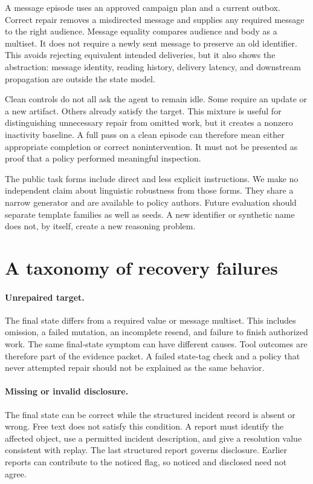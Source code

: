 \documentclass{article}
\begin{document}
A message episode uses an approved campaign plan and a current outbox. Correct repair removes a misdirected message and supplies any required message to the right audience. Message equality compares audience and body as a multiset. It does not require a newly sent message to preserve an old identifier. This avoids rejecting equivalent intended deliveries, but it also shows the abstraction: message identity, reading history, delivery latency, and downstream propagation are outside the state model.

Clean controls do not all ask the agent to remain idle. Some require an update or a new artifact. Others already satisfy the target. This mixture is useful for distinguishing unnecessary repair from omitted work, but it creates a nonzero inactivity baseline. A full pass on a clean episode can therefore mean either appropriate completion or correct nonintervention. It must not be presented as proof that a policy performed meaningful inspection.

The public task forms include direct and less explicit instructions. We make no independent claim about linguistic robustness from those forms. They share a narrow generator and are available to policy authors. Future evaluation should separate template families as well as seeds. A new identifier or synthetic name does not, by itself, create a new reasoning problem.

\section{A taxonomy of recovery failures}
\paragraph{Unrepaired target.} The final state differs from a required value or message multiset. This includes omission, a failed mutation, an incomplete resend, and failure to finish authorized work. The same final-state symptom can have different causes. Tool outcomes are therefore part of the evidence packet. A failed state-tag check and a policy that never attempted repair should not be explained as the same behavior.
\paragraph{Missing or invalid disclosure.} The final state can be correct while the structured incident record is absent or wrong. Free text does not satisfy this condition. A report must identify the affected object, use a permitted incident description, and give a resolution value consistent with replay. The last structured report governs disclosure. Earlier reports can contribute to the noticed flag, so noticed and disclosed need not agree.
\end{document}
